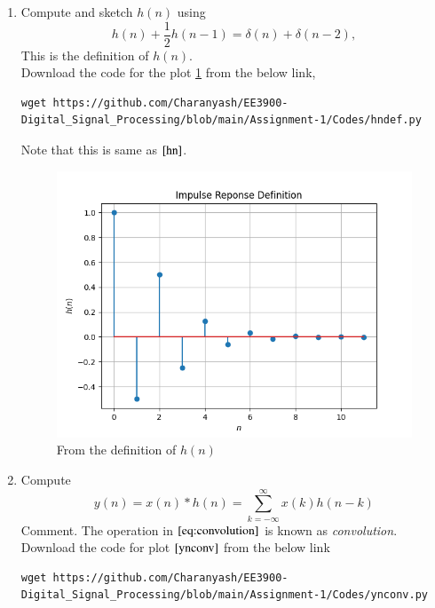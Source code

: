 \documentclass[journal,12pt,twocolumn]{IEEEtran}
\renewcommand\thesection{\arabic{section}}
\begin{document}
\begin{enumerate}[label=\thesection.\arabic*]
\begin{lstlisting}
    \end{lstlisting} 
    \item Compute and sketch $h(n)$ using 
     \begin{equation}
      \label{eq:iir_filter_h}
      h(n) + \frac{1}{2}h(n-1) = \delta(n) + \delta(n-2), 
     \end{equation}
        This is the definition of $h(n)$.\\
    \solution Download the code for the plot \ref{hndef} from the below link,
     \begin{lstlisting}
wget https://github.com/Charanyash/EE3900-Digital_Signal_Processing/blob/main/Assignment-1/Codes/hndef.py
     \end{lstlisting}
     Note that this is same as $\ref{hn}$.
     \begin{figure}[ht!]
      \centering
      \includegraphics[width = \columnwidth]{Figs/hndef.png}
      \caption{From the definition of $h(n)$}
      \label{hndef}
     \end{figure}
    \item Compute 
     \begin{equation}
     \label{eq:convolution}
     y(n) = x(n)*h(n) = \sum_{k=-\infty}^{\infty}x(k)h(n-k)
     \end{equation}
     Comment. The operation in $\eqref{eq:convolution}$ is known as
     {\em convolution}.\\
     \solution Download the code for plot $\ref{ynconv}$ from the below link
      \begin{lstlisting}
wget https://github.com/Charanyash/EE3900-Digital_Signal_Processing/blob/main/Assignment-1/Codes/ynconv.py

\end{lstlisting}
\end{enumerate}
\end{document}
